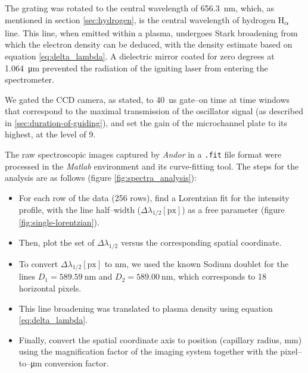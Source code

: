 \documentclass[../main.tex]{subfiles}
\begin{document}
The grating was rotated to the central wavelength of \SI{656.3}{\nm}, which, as mentioned in section \ref{sec:hydrogen}, is the central wavelength of hydrogen H\textsubscript{$\alpha$} line. This line, when emitted within a plasma, undergoes Stark broadening from which the electron density can be deduced, with the density estimate based on equation \ref{eq:delta_lambda}. A dielectric mirror coated for zero degrees at \SI{1.064}{\um} prevented the radiation of the igniting laser from entering the spectrometer.

We gated the CCD camera, as stated, to \SI{40}{\ns} gate--on time at time windows that correspond to the maximal transmission of the oscillator signal (as described in \ref{sec:duration-of-guiding}), and set the gain of the microchannel plate to its highest, at the level of 9.

The raw spectroscopic images captured by \textit{Andor} in a \texttt{.fit} file format were processed in the \textit{Matlab} environment and its curve-fitting tool. The steps for the analysis are as follows (figure \ref{fig:spectra_analysis}):
\begin{itemize}[label={$-$}]
\item For each row of the data (256 rows), find a Lorentzian fit for the intensity profile, with the line half--width ($\Delta\lambda_{1/2}\left[\text{px}\right]$) as a free parameter (figure \ref{fig:single-lorentzian}).
\item Then, plot the set of $\Delta\lambda_{1/2}$ versus the corresponding spatial coordinate.
\item To convert $\Delta\lambda_{1/2}\left[\text{px}\right]$ to \si{\nm}, we used the known Sodium doublet for the lines $D_1=\SI{589.59}{\nm}$ and $D_2=\SI{589.00}{\nm}$, which corresponds to 18 horizontal pixels.
\item This line broadening was translated to plasma density using equation \ref{eq:delta_lambda}.
\item Finally, convert the spatial coordinate axis to position (capillary radius, \si{\mm}) using the magnification factor of the imaging system together with the pixel--to--\si{\um} conversion factor.
\end{itemize}
\end{document}
